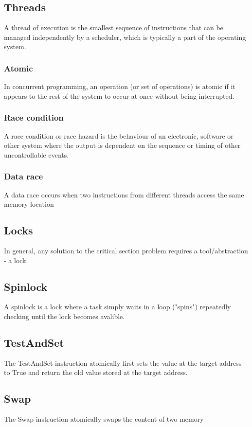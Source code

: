 \begin{multicols}{2}
\subsection{Threads}
A thread of execution is the smallest sequence of instructions
that can be managed independently by a scheduler, which is
typically a part of the operating system.

\subsubsection{Atomic}
In concurrent programming, an operation (or
set of operations) is atomic if it appears to the
rest of the system to occur at once without
being interrupted.

\subsubsection{Race condition}
A race condition or race hazard is the
behaviour of an electronic, software or other
system where the output is dependent on the
sequence or timing of other uncontrollable
events.

\subsubsection{Data race}
A data race occurs when two instructions from
different threads access the same memory location

\subsection{Locks}
In general, any solution to the
critical section problem requires a
tool/abstraction - a lock.

\subsection{Spinlock}
A spinlock is a lock where a task
simply waits in a loop ("spins")
repeatedly checking until the lock
becomes avalible.

\subsection{TestAndSet}
The TestAndSet instruction
atomically first sets the value at the
target address to True and return the
old value stored at the target address.

\subsection{Swap}
The Swap instruction atomically
swaps the content of two memory


\end{multicols}
